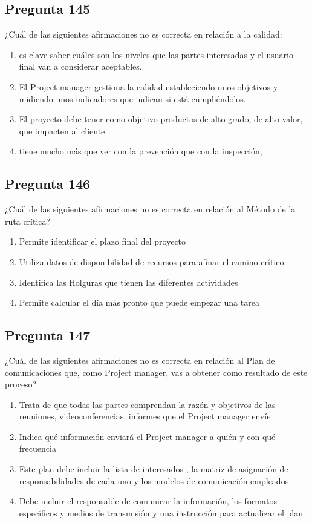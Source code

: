 \documentclass[11pt,a4paper]{article}
\begin{document}
\subsection*{Pregunta 145}
¿Cuál de las siguientes afirmaciones no es correcta en relación a la calidad:

\begin{enumerate}[label=\alph*)]
  \item es clave saber cuáles son los niveles que las partes interesadas y el usuario final van a considerar aceptables.
  \item El Project manager gestiona la calidad estableciendo unos objetivos y midiendo unos indicadores que indican si está cumpliéndolos.
  \item El proyecto debe tener como objetivo productos de alto grado, de alto valor, que impacten al cliente
  \item tiene mucho más que ver con la prevención que con la inspección,
\end{enumerate}

\subsection*{Pregunta 146}
¿Cuál de las siguientes afirmaciones no es correcta en relación al Método de la ruta crítica?

\begin{enumerate}[label=\alph*)]
  \item Permite identificar el plazo final del proyecto
  \item Utiliza datos de disponibilidad de recursos para afinar el camino crítico
  \item Identifica las Holguras que tienen las diferentes actividades
  \item Permite calcular el día más pronto que puede empezar una tarea
\end{enumerate}

\subsection*{Pregunta 147}
¿Cuál de las siguientes afirmaciones no es correcta en relación al Plan de comunicaciones que, como Project manager, vas a obtener como resultado de este proceso?

\begin{enumerate}[label=\alph*)]
  \item Trata de que todas las partes comprendan la razón y objetivos de las reuniones, videoconferencias, informes que el Project manager envíe
  \item Indica qué información enviará el Project manager a quién y con qué frecuencia
  \item Este plan debe incluir la lista de interesados , la matriz de asignación de responsabilidades de cada uno y los modelos de comunicación empleados
  \item Debe incluir el responsable de comunicar la información, los formatos específicos y medios de transmisión y una instrucción para actualizar el plan
\end{enumerate}
\end{document}
